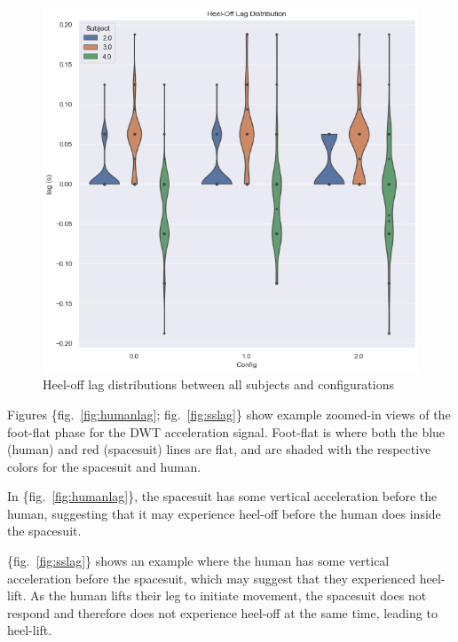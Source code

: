 \documentclass[defaultstyle,11pt]{comps}
\begin{document}
\begin{figure}
\hypertarget{fig:heeloffdist}{%
\centering
\includegraphics{../fig/SA1/heelOffLag.png}
\caption{Heel-off lag distributions between all subjects and configurations}\label{fig:heeloffdist}
}
\end{figure}

Figures \{fig.~\ref{fig:humanlag}; fig.~\ref{fig:sslag}\} show example zoomed-in views of the foot-flat phase for the DWT acceleration signal.
Foot-flat is where both the blue (human) and red (spacesuit) lines are flat, and are shaded with the respective colors for the spacesuit and human.

In \{fig.~\ref{fig:humanlag}\}, the spacesuit has some vertical acceleration before the human, suggesting that it may experience heel-off before the human does inside the spacesuit.

\{fig.~\ref{fig:sslag}\} shows an example where the human has some vertical acceleration before the spacesuit, which may suggest that they experienced heel-lift.
As the human lifts their leg to initiate movement, the spacesuit does not respond and therefore does not experience heel-off at the same time, leading to heel-lift.
\end{document}
